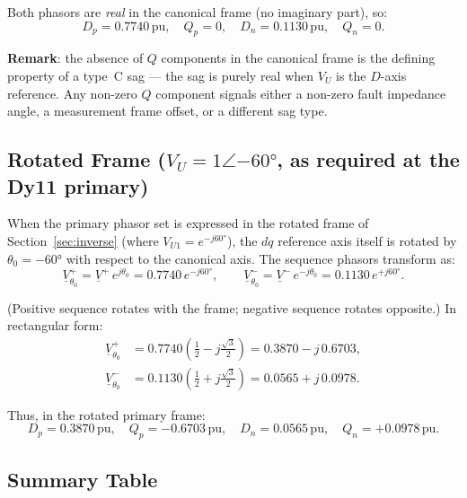 \documentclass[a4paper,11pt]{article}
\begin{document}
Both phasors are \emph{real} in the canonical frame (no imaginary part),
so:
\begin{equation}
\boxed{
D_p = 0.7740\,\mathrm{pu},\quad Q_p = 0,\quad
D_n = 0.1130\,\mathrm{pu},\quad Q_n = 0.
}
\label{eq:dq_canonical}
\end{equation}

\noindent \textbf{Remark}: the absence of $Q$ components in the canonical
frame is the defining property of a type~C sag — the sag is purely real
when $V_U$ is the $D$-axis reference.  Any non-zero $Q$ component signals
either a non-zero fault impedance angle, a measurement frame offset, or a
different sag type.

\subsection{Rotated Frame ($V_U = 1\angle{-60°}$, as required at the Dy11 primary)}

When the primary phasor set is expressed in the rotated frame of
Section~\ref{sec:inverse} (where $V_{U1} = e^{-j60°}$), the
$dq$ reference axis itself is rotated by $\theta_0 = -60°$ with respect
to the canonical axis.  The sequence phasors transform as:
\begin{equation}
\underline{V}^+_{\theta_0} = \underline{V}^+\,e^{j\theta_0}
  = 0.7740\,e^{-j60°},\qquad
\underline{V}^-_{\theta_0} = \underline{V}^-\,e^{-j\theta_0}
  = 0.1130\,e^{+j60°}.
\end{equation}

\noindent (Positive sequence rotates with the frame; negative sequence
rotates opposite.)  In rectangular form:
\begin{align}
\underline{V}^+_{\theta_0}
  &= 0.7740\!\left(\tfrac{1}{2} - j\tfrac{\sqrt{3}}{2}\right)
   = 0.3870 - j\,0.6703, \\[4pt]
\underline{V}^-_{\theta_0}
  &= 0.1130\!\left(\tfrac{1}{2} + j\tfrac{\sqrt{3}}{2}\right)
   = 0.0565 + j\,0.0978.
\end{align}

Thus, in the rotated primary frame:
\begin{equation}
\boxed{
D_p = 0.3870\,\mathrm{pu},\quad Q_p = -0.6703\,\mathrm{pu},\quad
D_n = 0.0565\,\mathrm{pu},\quad Q_n = +0.0978\,\mathrm{pu}.
}
\label{eq:dq_rotated}
\end{equation}

\subsection{Summary Table}
\end{document}
